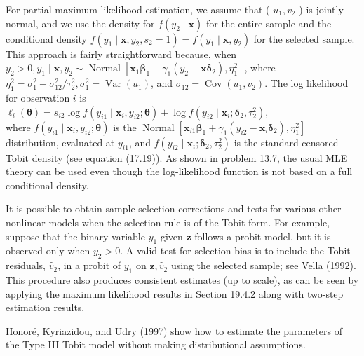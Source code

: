 \documentclass[10pt]{article}
\begin{document}
For partial maximum likelihood estimation, we assume that ( $u_{1}, v_{2}$ ) is jointly normal, and we use the density for $f\left(y_{2} \mid \mathbf{x}\right)$ for the entire sample and the conditional density $f\left(y_{1} \mid \mathbf{x}, y_{2}, s_{2}=1\right)=f\left(y_{1} \mid \mathbf{x}, y_{2}\right)$ for the selected sample. This approach is fairly straightforward because, when $y_{2}>0, y_{1} \mid \mathbf{x}, y_{2} \sim \operatorname{Normal}\left[\mathbf{x}_{1} \boldsymbol{\beta}_{1}+\right. \left.\gamma_{1}\left(y_{2}-\mathbf{x} \boldsymbol{\delta}_{2}\right), \eta_{1}^{2}\right]$, where $\eta_{1}^{2}=\sigma_{1}^{2}-\sigma_{12}^{2} / \tau_{2}^{2}, \sigma_{1}^{2}=\operatorname{Var}\left(u_{1}\right)$, and $\sigma_{12}=\operatorname{Cov}\left(u_{1}, v_{2}\right)$. The log likelihood for observation $i$ is\\
$\ell_{i}(\boldsymbol{\theta})=s_{i 2} \log f\left(y_{i 1} \mid \mathbf{x}_{i}, y_{i 2} ; \boldsymbol{\theta}\right)+\log f\left(y_{i 2} \mid \mathbf{x}_{i} ; \boldsymbol{\delta}_{2}, \tau_{2}^{2}\right)$,\\
where $f\left(y_{i 1} \mid \mathbf{x}_{i}, y_{i 2} ; \boldsymbol{\theta}\right)$ is the $\operatorname{Normal}\left[\mathbf{x}_{i 1} \boldsymbol{\beta}_{1}+\gamma_{1}\left(y_{i 2}-\mathbf{x}_{i} \boldsymbol{\delta}_{2}\right), \eta_{1}^{2}\right]$ distribution, evaluated at $y_{i 1}$, and $f\left(y_{i 2} \mid \mathbf{x}_{i} ; \boldsymbol{\delta}_{2}, \tau_{2}^{2}\right)$ is the standard censored Tobit density (see equation (17.19)). As shown in problem 13.7, the usual MLE theory can be used even though the log-likelihood function is not based on a full conditional density.

It is possible to obtain sample selection corrections and tests for various other nonlinear models when the selection rule is of the Tobit form. For example, suppose that the binary variable $y_{1}$ given $\mathbf{z}$ follows a probit model, but it is observed only when $y_{2}>0$. A valid test for selection bias is to include the Tobit residuals, $\hat{v}_{2}$, in a probit of $y_{1}$ on $\mathbf{z}, \hat{v}_{2}$ using the selected sample; see Vella (1992). This procedure also produces consistent estimates (up to scale), as can be seen by applying the maximum likelihood results in Section 19.4.2 along with two-step estimation results.

Honoré, Kyriazidou, and Udry (1997) show how to estimate the parameters of the Type III Tobit model without making distributional assumptions.
\end{document}
